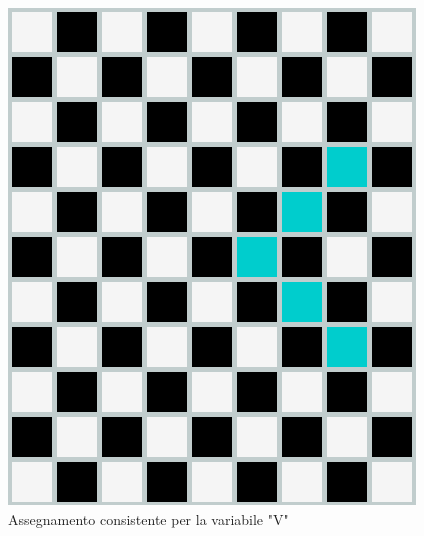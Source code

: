 \begin{figure}[h]
	\centering
	\includegraphics[scale=0.25]{immagini/goodCC}
	\caption{Assegnamento consistente per la variabile "V"}
	\label{fig:CCC}
\end{figure}

